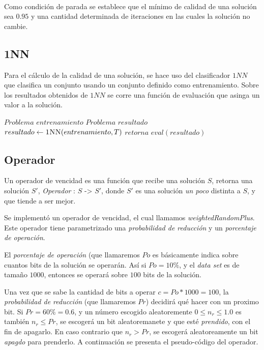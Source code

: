 \documentclass[11pt]{article}
\begin{document}
    ~\ 

    Como condición de parada se establece que el mínimo de calidad de una solución sea $0.95$ y una cantidad determinada de iteraciones en las cuales la solución no cambie.

\subsection{1NN}
    Para el cálculo de la calidad de una solución, se hace uso del clasificador $1NN$ que clasifica un conjunto usando un conjunto definido como entrenamiento. Sobre los resultados obtenidos de $1NN$ se corre una función de evaluación que asinga un valor a la solución. \\

    {\fontsize{10}{10}\selectfont
    \begin{algorithmic}
            \State $Problema$  $entrenamiento$
            \State $Problema$  $resultado$
            \State $resultado \gets \Call{1NN}{entrenamiento, T}$
            \State $retorna$ $eval(resultado)$
        \EndFunction
    \end{algorithmic}
    }


\subsection{Operador}

Un operador de vencidad es una función que recibe una solución $S$,
retorna una solución $S'$,  \emph{Operador} : $S$ -> $S'$, donde $S'$ es una solución \emph{un poco} distinta
a $S$, y que tiende a ser mejor.

Se implementó un operador de vencidad, el cual llamamos \emph{weightedRandomPlus}.
Este operador tiene parametrizado una \emph{probabilidad de reducción} y
un \emph{porcentaje de operación}. 

El \emph{porcentaje de operación} (que llamaremos $Po$ es básicamente
indica sobre cuantos bits de la solución se operarán. Así si $Po = 10 \%$,
y el \emph{data set} es de tamaño $1000$, entonces se operará sobre
$100$ bits de la solución.

Una vez que se sabe la cantidad de bits a operar $c = Po * 1000 = 100$,
la \emph{probabilidad de reducción} (que llamaremos $Pr$)
decidirá qué hacer con un proximo bit.
Si $Pr = 60 \% = 0.6$, y un número escogido aleatoremente $0 \le n_{r} \le 1.0$
es también $n_{r} \le Pr$, se escogerá un bit aleatoremanete y que esté
\emph{prendido}, con el fin de apagarlo. En caso contrario que $n_{r} > Pr$,
se escogerá aleatoreamente un bit \emph{apagdo} para prenderlo. A continuación
se presenta el pseudo-código del operador. \\
\end{document}
